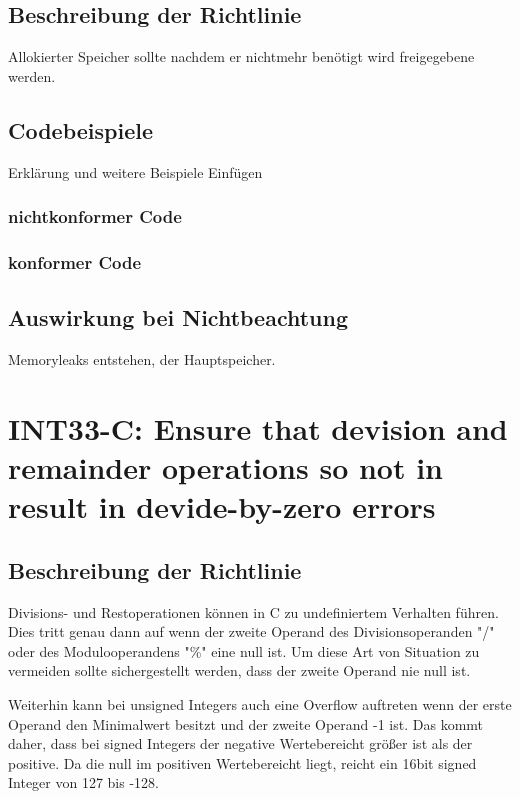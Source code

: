 \documentclass[12pt]{article}
\begin{document}
\subsection{Beschreibung der Richtlinie}
Allokierter Speicher sollte nachdem er nichtmehr benötigt wird freigegebene werden.
\subsection{Codebeispiele}
Erklärung und weitere Beispiele Einfügen
\subsubsection{nichtkonformer Code}

\subsubsection{konformer Code}


\subsection{Auswirkung bei Nichtbeachtung}
Memoryleaks entstehen, der Hauptspeicher.


\newpage
\section{INT33-C: Ensure that devision and remainder operations so not in result in devide-by-zero errors}
\subsection{Beschreibung der Richtlinie}

Divisions- und Restoperationen können in C zu undefiniertem Verhalten führen.
Dies tritt genau dann auf wenn der zweite Operand des Divisionsoperanden "/" oder des Modulooperandens "\%" eine null ist.
Um diese Art von Situation zu vermeiden sollte sichergestellt werden, dass der zweite Operand nie null ist.


Weiterhin kann bei unsigned Integers auch eine Overflow auftreten wenn der erste Operand den Minimalwert besitzt und der zweite Operand -1 ist. Das kommt daher, dass bei signed Integers der negative Wertebereicht größer ist als der positive. Da die null im positiven Wertebereicht liegt, reicht ein 16bit signed Integer von 127 bis -128.
\end{document}
